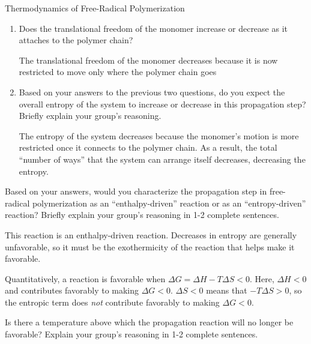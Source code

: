 \begin{activity}{Thermodynamics of Free-Radical Polymerization}
\begin{ctqs}
\begin{enumerate}
				\begin{solution}[0.5in]{}
					Decreases by 1 (monomer becomes part of the polymer chain)
				\end{solution}
			
			\item Does the translational freedom of the monomer increase or decrease as it attaches to the polymer chain?
				
				\begin{solution}[0.5in]{}
					The translational freedom of the monomer decreases because it is now restricted to move only where the polymer chain goes
				\end{solution}
			
			\item Based on your answers to the previous two questions, do you expect the overall entropy of the system to increase or decrease in this propagation step?  Briefly explain your group's reasoning.
				
				\begin{solution}[1.25in]{}
					The entropy of the system decreases because the monomer's motion is more restricted once it connects to the polymer chain.  As a result, the total ``number of ways'' that the system can arrange itself decreases, decreasing the entropy.
				\end{solution}
			
		\end{enumerate}
	
	\question Based on your answers, would you characterize the propagation step in free-radical polymerization as an ``enthalpy-driven'' reaction or as an ``entropy-driven'' reaction?  Briefly explain your group's reasoning in 1-2 complete sentences.
	
		\begin{solution}[1.25in]{}
			This reaction is an enthalpy-driven reaction.  Decreases in entropy are generally unfavorable, so it must be the exothermicity of the reaction that helps make it favorable.
			
			Quantitatively, a reaction is favorable when $\Delta G = \Delta H - T\Delta S < 0$.  Here, $\Delta H < 0$ and contributes favorably to making $\Delta G < 0$.  $\Delta S < 0$ means that $-T \Delta S > 0$, so the entropic term does \emph{not} contribute favorably to making $\Delta G < 0$.
		\end{solution}
		
	\question Is there a temperature above which the propagation reaction will no longer be favorable?  Explain your group's reasoning in 1-2 complete sentences.\label{\labelbase:ctq:ceilingconcept}
	

\end{ctqs}
\end{activity}
